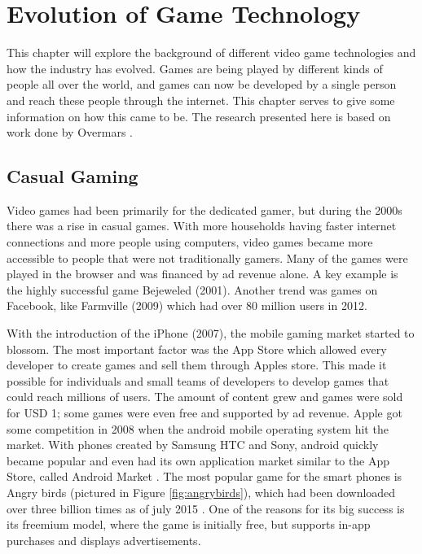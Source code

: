 \chapter{Evolution of Game Technology}
\label{ch:gameshistory}
This chapter will explore the background of different video game technologies and how the industry has evolved. Games are being played by different kinds of people all over the world, and games can now be developed by a single person and reach these people through the internet. This chapter serves to give some information on how this came to be. The research presented here is based on work done by Overmars \cite{overmars2012}.


\section{Casual Gaming}
\label{sec:casualgaming}
Video games had been primarily for the dedicated gamer, but during the 2000s there was a rise in casual games. With more households having faster internet connections and more people using computers, video games became more accessible to people that were not traditionally gamers. Many of the games were played in the browser and was financed by ad revenue alone. A key example is the highly successful game Bejeweled (2001). Another trend was games on Facebook, like Farmville (2009) which had over 80 million users in 2012.

With the introduction of the iPhone (2007), the mobile gaming market started to blossom. The most important factor was the App Store which allowed every developer to create games and sell them through Apples store. This made it possible for individuals and small teams of developers to develop games that could reach millions of users. The amount of content grew and games were sold for USD 1; some games were even free and supported by ad revenue. Apple got some competition in 2008 when the android mobile operating system hit the market. With phones created by Samsung HTC and Sony, android quickly became popular and even had its own application market similar to the App Store, called Android Market \cite{2015android}. The most popular game for the smart phones is Angry birds (pictured in Figure \ref{fig:angrybirds}), which had been downloaded over three billion times as of july 2015 \cite{2015forbes}. One of the reasons for its big success is its freemium model, where the game is initially free, but supports in-app purchases and displays advertisements.

